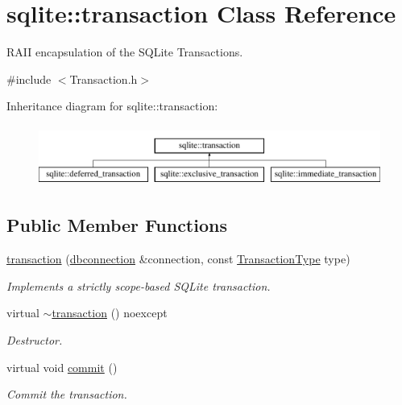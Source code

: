 \hypertarget{a00014}{\section{sqlite\-:\-:transaction Class Reference}
\label{a00014}
}


R\-A\-I\-I encapsulation of the S\-Q\-Lite Transactions.  




{\ttfamily \#include $<$Transaction.\-h$>$}

Inheritance diagram for sqlite\-:\-:transaction\-:\begin{figure}[H]
\begin{center}
\leavevmode
\includegraphics[height=2.000000cm]{a00014}
\end{center}
\end{figure}
\subsection*{Public Member Functions}
\begin{DoxyCompactItemize}
\item 
\hyperlink{a00014_ac5e2efbcd15f1531c00cbcacfa74c3f0}{transaction} (\hyperlink{a00004}{dbconnection} \&connection, const \hyperlink{a00038_aea994c2d3b1e9448cd9c526b44f78890}{Transaction\-Type} type)
\begin{DoxyCompactList}\small\item\em Implements a strictly scope-\/based S\-Q\-Lite transaction. \end{DoxyCompactList}\item 
virtual \hyperlink{a00014_a798101cf276674d19708c1958e5b03fb}{$\sim$transaction} () noexcept
\begin{DoxyCompactList}\small\item\em Destructor. \end{DoxyCompactList}\item 
\hypertarget{a00014_abe219dd0bf949d569381f9830c7b2d1a}{virtual void \hyperlink{a00014_abe219dd0bf949d569381f9830c7b2d1a}{commit} ()}\label{a00014_abe219dd0bf949d569381f9830c7b2d1a}

\begin{DoxyCompactList}\small\item\em Commit the transaction. \end{DoxyCompactList}\end{DoxyCompactItemize}


